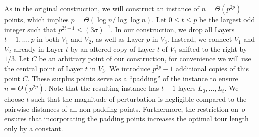 \documentclass[11pt,DIV=12,a4paper]{scrartcl}
\begin{document}
As in the original construction, we will construct an instance of $n=\Theta(p^{2p})$ points, which implies $p=\Theta(\log n/\log \log n)$. Let $0\le t \le p$ be the largest odd integer such that $p^{2t+1} \le (3\sigma)^{-1}$. In our construction, we drop all Layers $t+1, \dots, p$ in both $V_1$ and $V_2$, as well as Layer $p$ in $V_3$. Instead, we connect $V_1$ and $V_2$ already in Layer $t$ by an altered copy 
 of Layer $t$ of $V_1$ shifted to the right by $1/3$. Let $C$ be an arbitrary point of our construction, for convenience we will use the central point of Layer $t$ in $V_3$. We introduce $p^{2p}-1$ additional copies of this point $C$. These surplus points serve as a ``padding'' of the instance to ensure $n=\Theta(p^{2p})$. Note that the resulting instance has $t+1$ layers $L_0, \dots, L_t$. 
We choose $t$ such that the magnitude of perturbation is negligible compared to the pairwise distances of all non-padding points. Furthermore, the restriction on~$\sigma$ ensures that incorporating the padding points increases the optimal tour length only by a constant.
\end{document}
